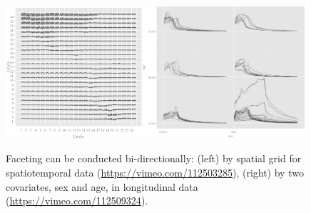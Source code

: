 \documentclass[12pt]{article}
\begin{document}
\begin{figure}[htp]
\begin{center}
\includegraphics[width=0.45\textwidth]{graph/pipeline-24-4}\includegraphics[width=0.54\textwidth]{graph/pipeline-25-2}

\caption{\label{fig:faceting-examples}Faceting can be conducted bi-directionally: (left) by spatial grid for spatiotemporal data (\url{https://vimeo.com/112503285}), (right) by two covariates, sex and age, in longitudinal data (\url{https://vimeo.com/112509324}).}
\end{center}
\end{figure}
\end{document}
